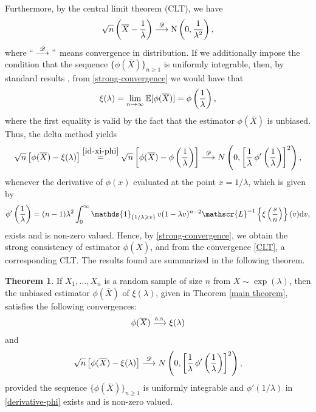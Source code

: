 \documentclass[12pt]{article}
\theoremstyle{definition}
\newtheorem{theorem}{Theorem}[section]
\begin{document}
Furthermore,  by the 
central limit theorem (CLT), we have
\begin{align*}
	\sqrt{n}\left(\overline{X}-{1\over\lambda}\right)
	\stackrel{\mathscr{D}}{\longrightarrow} \text{N}\left(0,{1\over\lambda^2}\right),
\end{align*}
where $``\stackrel{\mathscr{D}}{\longrightarrow}"$ means convergence in distribution. 
If we additionally impose the condition that the sequence $\{\phi(\overline{X})\}_{n\geqslant 1}$ is uniformly integrable, then, by standard results  \citep[cf.][Theorem 5.4]{Billingsley1968}, from \eqref{strong-convergence} we would have that
\begin{align}\label{id-xi-phi}
	\xi(\lambda)
	=
	\lim_{n\to\infty}\mathbb{E}[\phi(\overline{X})]
	=
	\phi\left({1\over\lambda}\right),
\end{align}
where the first equality is valid by the fact that the estimator $\phi(\overline{X})$ is unbiased.
Thus, the delta method yields
\begin{align}\label{CLT}
	\sqrt{n}\left[\phi(\overline{X})-\xi(\lambda)\right]
	\stackrel{\eqref{id-xi-phi}}{=}
	\sqrt{n}\left[\phi(\overline{X})-\phi\left({1\over\lambda}\right)\right]
	\stackrel{\mathscr{D}}{\longrightarrow} N\left(0,\left[{1\over\lambda} \,  \phi'\left({1\over\lambda}\right)\right]^2\right),
\end{align}
whenever the derivative of $\phi(x)$ evaluated at the point $x=1/\lambda$, which is given by
\begin{align}\label{derivative-phi}
	\phi'\left({1\over\lambda}\right)
	=
	(n-1) \lambda^2
	\int_0^{\infty} 
	\mathds{1}_{\{1/\lambda \geqslant  v\}} \,
	v
	(1-\lambda{v})^{n-2} 
	\mathscr{L}^{-1}\left\{\xi\left({s\over n}\right)
	\right\}(v){\rm d}v,
\end{align}
exists and is non-zero valued.
Hence, by \eqref{strong-convergence}, we obtain the strong consistency of estimator $\phi(\overline{X})$, and from the  convergence \eqref{CLT}, a corresponding
CLT. The results found are summarized in the following theorem.
%
\begin{theorem}\label{theo-clt}
	If $X_1,\ldots,X_n$ is a random sample of size $n$ from $X\sim\exp(\lambda)$, then the unbiased estimator $\phi(\overline{X})$ of $\xi(\lambda)$, given in Theorem \ref{main theorem}, satisfies the following convergences:
	\begin{align*}
		\phi(\overline{X})\stackrel{\rm a.s.}{\longrightarrow}  \xi(\lambda)
	\end{align*}
	and
	\begin{align*}
		\sqrt{n}\left[\phi(\overline{X})-\xi(\lambda)\right]
		\stackrel{\mathscr{D}}{\longrightarrow} N\left(0,\left[{1\over\lambda} \,  \phi'\left({1\over\lambda}\right)\right]^2\right),
	\end{align*}
	provided the sequence $\{\phi(\overline{X})\}_{n\geqslant 1}$ is uniformly integrable and $\phi'\left({1/\lambda}\right)$ in \eqref{derivative-phi} exists and is non-zero valued.
\end{theorem}
\end{document}
